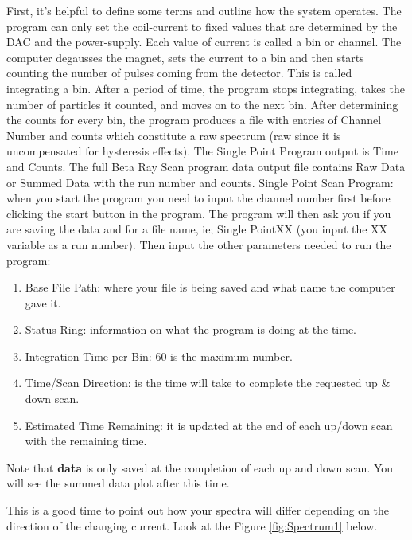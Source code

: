\documentclass{../lab}
\begin{document}
First, it's helpful to define some terms and outline how the system operates. The program can only set the coil-current to fixed values that are determined by the DAC and the power-supply. Each value of current is called a bin or channel. The computer degausses the magnet, sets the current to a bin and then starts counting the number of pulses coming from the detector. This is called integrating a bin. After a period of time, the program stops integrating, takes the number of particles it counted, and moves on to the next bin. After determining the counts for every bin, the program produces a file with entries of Channel Number and counts which constitute a raw spectrum (raw since it is uncompensated for hysteresis effects). The Single Point Program output is Time and Counts. The full Beta Ray Scan program data output file contains Raw Data or Summed Data with the run number and counts. Single Point Scan Program: when you start the program you need to input the channel number first before clicking the start button in the program. The program will then ask you if you are saving the data and for a file name, ie; Single PointXX (you input the XX variable as a run number). Then input the other parameters needed to run the program:

\begin{enumerate}
    \item Base File Path: where your file is being saved and what name the computer gave it.

    \item Status Ring: information on what the program is doing at the time.

    \item Integration Time per Bin: 60 is the maximum number.

    \item Time/Scan Direction: is the time will take to complete the requested up \& down scan.

    \item Estimated Time Remaining: it is updated at the end of each up/down scan with the remaining time.

\end{enumerate}

Note that \textbf{data} is only saved at the completion of each up and down scan. You will see the summed data plot after this time.

This is a good time to point out how your spectra will differ depending on the direction of the changing current. Look at the Figure \ref{fig:Spectrum1} below.
\end{document}

